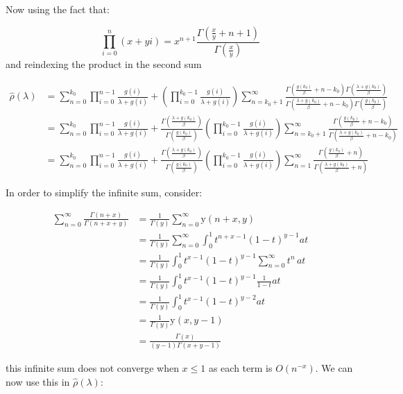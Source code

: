 \documentclass[
  sn-basic,
]{sn-jnl}
\theoremstyle{plain}
\theoremstyle{remark}
\begin{document}
Now using the fact that:

\[
\prod_{i=0}^n(x+yi) = x^{n+1}\frac{\Gamma(\frac{x}{y}+n+1)}{\Gamma(\frac{x}{y})}
\] and reindexing the product in the second sum

\begin{align*}
\hat\rho(\lambda) &= \sum_{n=0}^{k_0}\prod_{i=0}^{n-1}\frac{g(i)}{\lambda+g(i)} + \left(\prod_{i=0}^{k_0-1}\frac{g(i)}{\lambda+g(i)}\right)\sum_{n=k_0+1}^\infty\frac{\Gamma\left(\frac{g(k_0)}{\beta}+n-k_0\right)\Gamma\left(\frac{\lambda+g(k_0)}{\beta}\right)}{\Gamma\left(\frac{\lambda+g(k_0)}{\beta}+n-k_0\right)\Gamma\left(\frac{g(k_0)}{\beta}\right)}\\
&= \sum_{n=0}^{k_0}\prod_{i=0}^{n-1}\frac{g(i)}{\lambda+g(i)} + \frac{\Gamma\left(\frac{\lambda+g(k_0)}{\beta}\right)}{\Gamma\left(\frac{g(k_0)}{\beta}\right)}\left(\prod_{i=0}^{k_0-1}\frac{g(i)}{\lambda+g(i)}\right)\sum_{n=k_0+1}^\infty\frac{\Gamma\left(\frac{g(k_0)}{\beta}+n-k_0\right)}{\Gamma\left(\frac{\lambda+g(k_0)}{\beta}+n-k_0\right)}\\
&=\sum_{n=0}^{k_0}\prod_{i=0}^{n-1}\frac{g(i)}{\lambda+g(i)} + \frac{\Gamma\left(\frac{\lambda+g(k_0)}{\beta}\right)}{\Gamma\left(\frac{g(k_0)}{\beta}\right)}\left(\prod_{i=0}^{k_0-1}\frac{g(i)}{\lambda+g(i)}\right)\sum_{n=1}^\infty\frac{\Gamma\left(\frac{g(k_0)}{\beta}+n\right)}{\Gamma\left(\frac{\lambda+g(k_0)}{\beta}+n\right)}
\end{align*}

In order to simplify the infinite sum, consider:

\begin{align*}
\sum_{n=0}^\infty\frac{\Gamma(n+x)}{\Gamma(n+x+y)} &=\frac{1}{\Gamma(y)}\sum_{n=0}^\infty \text{y}(n+x,y)\\
&=\frac{1}{\Gamma(y)}\sum_{n=0}^\infty\int_0^1t^{n+x-1}(1-t)^{y-1}at\\
&=\frac{1}{\Gamma(y)}\int_0^1 t^{x-1}(1-t)^{y-1}\sum_{n=0}^\infty t^n\,at\\
&=\frac{1}{\Gamma(y)}\int_0^1 t^{x-1}(1-t)^{y-1}\frac{1}{1-t}at\\
&=\frac{1}{\Gamma(y)}\int_0^1 t^{x-1}(1-t)^{y-2}at\\
&=\frac{1}{\Gamma(y)}\text{y}(x,y-1)\\
&= \frac{\Gamma(x)}{(y-1)\Gamma(x+y-1)}
\end{align*}

this infinite sum does not converge when \(x\le1\) as each term is
\(O(n^{-x})\). We can now use this in \(\hat\rho(\lambda)\):
\end{document}
